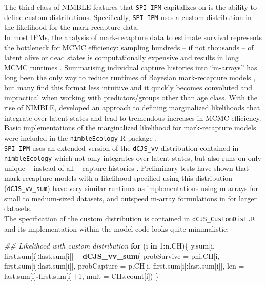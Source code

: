 \documentclass[
]{book}
\newenvironment{Shaded}{\begin{snugshade}}{\end{snugshade}}
\newcommand{\CommentTok}[1]{\textcolor[rgb]{0.56,0.35,0.01}{\textit{#1}}}
\newcommand{\ControlFlowTok}[1]{\textcolor[rgb]{0.13,0.29,0.53}{\textbf{#1}}}
\newcommand{\DataTypeTok}[1]{\textcolor[rgb]{0.13,0.29,0.53}{#1}}
\newcommand{\DecValTok}[1]{\textcolor[rgb]{0.00,0.00,0.81}{#1}}
\newcommand{\KeywordTok}[1]{\textcolor[rgb]{0.13,0.29,0.53}{\textbf{#1}}}
\newcommand{\NormalTok}[1]{#1}
\newcommand{\OperatorTok}[1]{\textcolor[rgb]{0.81,0.36,0.00}{\textbf{#1}}}
\newcommand{\StringTok}[1]{\textcolor[rgb]{0.31,0.60,0.02}{#1}}
\begin{document}
The third class of NIMBLE features that \texttt{SPI-IPM} capitalizes on is the ability
to define custom distributions. Specifically, \texttt{SPI-IPM} uses a custom distribution
in the likelihood for the mark-recapture data.\\
In most IPMs, the analysis of mark-recapture data to estimate survival represents
the bottleneck for MCMC efficiency: sampling hundreds -- if not thousands -- of
latent alive or dead states is computationally expensive and results in long
MCMC runtimes \citep{gimenez2007}.
Summarising individual capture histories into ``m-arrays'' has long been the only
way to reduce runtimes of Bayesian mark-recapture models \citep{kery2011}, but many
find this format less intuitive and it quickly becomes convoluted and impractical
when working with predictors/groups other than age class. With the rise of
NIMBLE, \citet{turek2016} developed an approach to defining marginalized likelihoods
that integrate over latent states and lead to tremendous increases in MCMC
efficiency. Basic implementations of the marginalized likelihood for mark-recapture
models were included in the \texttt{nimbleEcology} R package \citep{nimbleEcol}.\\
\texttt{SPI-IPM} uses an extended version of the \texttt{dCJS\_vv} distribution contained in
\texttt{nimbleEcology} which not only integrates over latent states, but also runs on
only unique -- instead of all -- capture histories \citep[analogous to the goose
example in][]{turek2016}. Preliminary tests have shown that mark-recapture models
with a likelihood specified using this distribution (\texttt{dCJS\_vv\_sum}) have very
similar runtimes as implementations using m-arrays for small to medium-sized
datasets, and outspeed m-array formulations in for larger datasets.\\
The specification of the custom distribution is contained in \texttt{dCJS\_CustomDist.R}
and its implementation within the model code looks quite minimalistic:

\begin{Shaded}
\begin{Highlighting}[]
\CommentTok{## Likelihood with custom distribution}
\ControlFlowTok{for}\NormalTok{ (i }\ControlFlowTok{in} \DecValTok{1}\OperatorTok{:}\NormalTok{n.CH)\{}
\NormalTok{  y.sum[i, first.sum[i]}\OperatorTok{:}\NormalTok{last.sum[i]] }\OperatorTok{~}\StringTok{ }\KeywordTok{dCJS_vv_sum}\NormalTok{(}
       \DataTypeTok{probSurvive =}\NormalTok{ phi.CH[i, first.sum[i]}\OperatorTok{:}\NormalTok{last.sum[i]],}
       \DataTypeTok{probCapture =}\NormalTok{ p.CH[i, first.sum[i]}\OperatorTok{:}\NormalTok{last.sum[i]],}
       \DataTypeTok{len =}\NormalTok{ last.sum[i]}\OperatorTok{-}\NormalTok{first.sum[i]}\OperatorTok{+}\DecValTok{1}\NormalTok{,}
       \DataTypeTok{mult =}\NormalTok{ CHs.count[i])}
\NormalTok{\}}
\end{Highlighting}
\end{Shaded}
\end{document}
